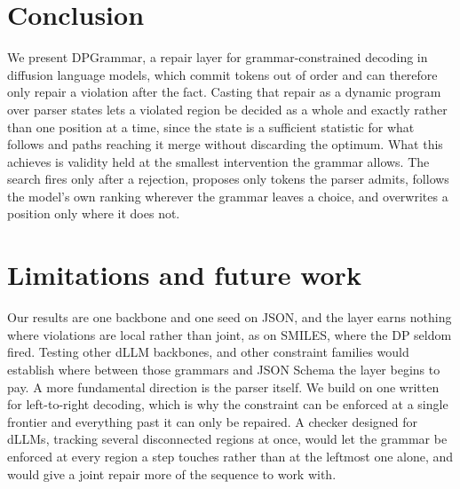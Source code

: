 \documentclass{article}
\begin{document}
\section{Conclusion}

We present DPGrammar, a repair layer for grammar-constrained decoding in
diffusion language models, which commit tokens out of order and can therefore
only repair a violation after the fact. Casting that repair as a dynamic program
over parser states lets a violated region be decided as a whole and exactly
rather than one position at a time, since the state is a sufficient statistic
for what follows and paths reaching it merge without discarding the optimum.
What this achieves is validity held at the smallest intervention the grammar
allows. The search fires only after a rejection, proposes only tokens the parser
admits, follows the model's own ranking wherever the grammar leaves a choice,
and overwrites a position only where it does not.

\section{Limitations and future work}
\label{sec:limits}

Our results are one backbone and one seed on JSON, and the layer earns nothing
where violations are local rather than joint, as on SMILES, where the DP seldom fired. 
Testing other dLLM backbones, and other constraint families would establish where between those grammars and JSON Schema the layer begins to pay.
A more fundamental direction is the parser itself. We build on one written for
left-to-right decoding, which is why the constraint can be enforced at a single
frontier and everything past it can only be repaired. A checker designed for
dLLMs, tracking several disconnected regions at once, would let the grammar be
enforced at every region a step touches rather than at the leftmost one alone,
and would give a joint repair more of the sequence to work with.
\end{document}
